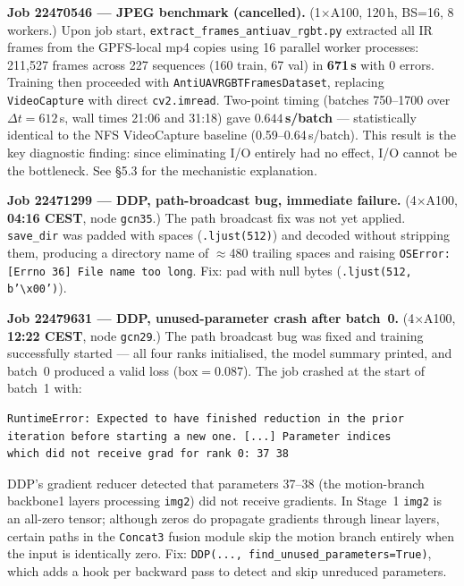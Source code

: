 \textbf{Job 22470546 — JPEG benchmark (cancelled).}
(1$\times$A100, 120\,h, BS=16, 8 workers.) Upon job start,
\texttt{extract\_frames\_antiuav\_rgbt.py} extracted all IR frames
from the GPFS-local mp4 copies using 16 parallel worker processes:
211,527 frames across 227 sequences (160 train, 67 val) in
\textbf{671\,s} with 0 errors. Training then proceeded with
\texttt{AntiUAVRGBTFramesDataset}, replacing \texttt{VideoCapture}
with direct \texttt{cv2.imread}. Two-point timing (batches
750--1700 over $\Delta t = 612$\,s, wall times 21:06 and 31:18)
gave $\mathbf{0.644}$\,\textbf{s/batch} — statistically identical
to the NFS VideoCapture baseline (0.59--0.64\,s/batch). This
result is the key diagnostic finding: since eliminating I/O
entirely had no effect, I/O cannot be the bottleneck.
See §5.3 for the mechanistic explanation.

\textbf{Job 22471299 — DDP, path-broadcast bug, immediate failure.}
(4$\times$A100, \textbf{04:16 CEST}, node \texttt{gcn35}.) The path
broadcast fix was not yet applied. \texttt{save\_dir} was padded with
spaces (\texttt{.ljust(512)}) and decoded without stripping them,
producing a directory name of $\approx$480 trailing spaces and raising
\texttt{OSError: [Errno 36] File name too long}. Fix: pad with null
bytes (\texttt{.ljust(512,\,b'\textbackslash x00')}).

\textbf{Job 22479631 — DDP, unused-parameter crash after batch~0.}
(4$\times$A100, \textbf{12:22 CEST}, node \texttt{gcn29}.) The path
broadcast bug was fixed and training successfully started — all four
ranks initialised, the model summary printed, and batch~0 produced a
valid loss ($\text{box}=0.087$). The job crashed at the start of
batch~1 with:
\begin{verbatim}
RuntimeError: Expected to have finished reduction in the prior
iteration before starting a new one. [...] Parameter indices
which did not receive grad for rank 0: 37 38
\end{verbatim}
DDP's gradient reducer detected that parameters 37--38 (the
motion-branch backbone1 layers processing \texttt{img2}) did not
receive gradients. In Stage~1 \texttt{img2} is an all-zero tensor;
although zeros do propagate gradients through linear layers, certain
paths in the \texttt{Concat3} fusion module skip the motion branch
entirely when the input is identically zero. Fix: \texttt{DDP(...,
find\_unused\_parameters=True)}, which adds a hook per backward pass
to detect and skip unreduced parameters.

